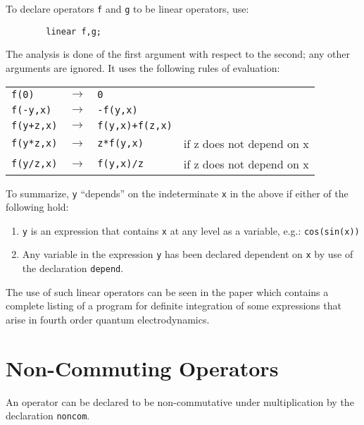 To declare operators \texttt{f} and \texttt{g} to be linear operators,
use:
\begin{verbatim}
        linear f,g;
\end{verbatim}
The analysis is done of the first argument with respect to the second; any
other arguments are ignored. It uses the following rules of evaluation:
\begin{flushleft}
  \hspace{0.5in}%
  \begin{tabular}{llll}
    \texttt{f(0)}     & $\longrightarrow$ & \texttt{0} \\
    \texttt{f(-y,x)}  & $\longrightarrow$ & \texttt{-f(y,x)} \\
    \texttt{f(y+z,x)} & $\longrightarrow$ & \texttt{f(y,x)+f(z,x)} & \\
    \texttt{f(y*z,x)} & $\longrightarrow$ & \texttt{z*f(y,x)}      &
    if z does not depend on x \\
    \texttt{f(y/z,x)} & $\longrightarrow$ & \texttt{f(y,x)/z}      &
    if z does not depend on x
  \end{tabular}
\end{flushleft}
To summarize, \texttt{y} ``depends'' on the indeterminate \texttt{x} in the above
if either of the following hold:
\begin{enumerate}
\item \texttt{y} is an expression that contains \texttt{x} at any level as a
      variable, e.g.: \texttt{cos(sin(x))}

\item Any variable in the expression \texttt{y} has been declared dependent on
      \texttt{x} by use of the declaration \texttt{depend}.
\end{enumerate}
The use of such linear operators can be seen in the
paper \cite{Fox:74} which contains a complete listing of a program for definite
integration of some expressions that arise in fourth
order quantum electrodynamics.

\section{Non-Commuting Operators}
\hypertarget{command:NONCOM}{}
An operator can be declared to be non-commutative under multiplication by
the declaration \texttt{noncom}.


